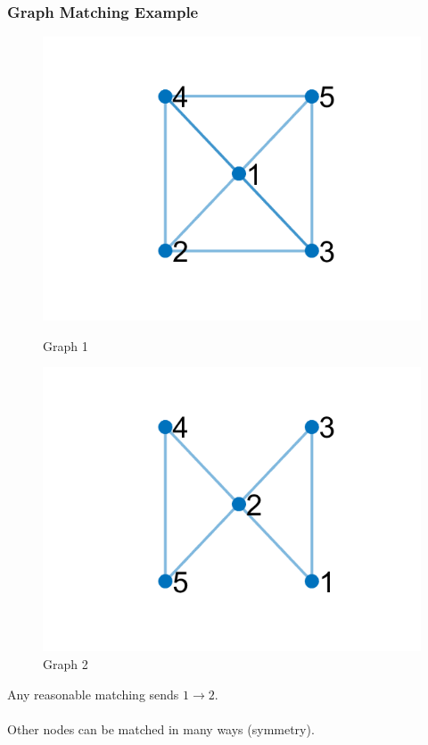 \documentclass{beamer}
\begin{document}
\begin{frame}
  \frametitle{Graph Matching Example}
  \begin{figure}[ht]
    \centering
    \begin{minipage}[b]{0.40\linewidth}
      \centering
      \includegraphics[width=\textwidth]{./Images/GraphMatch/structureEx1.png}
      \caption{Graph 1}
    \end{minipage}
    \begin{minipage}[b]{0.40\linewidth}
      \centering
      \includegraphics[width=\textwidth]{./Images/GraphMatch/structureEx2.png}
      \caption{Graph 2}
    \end{minipage}
  \end{figure}
  Any reasonable matching sends $1 \to 2$. \\~\\
  Other nodes can be matched in many ways (symmetry).
\end{frame}
\end{document}
